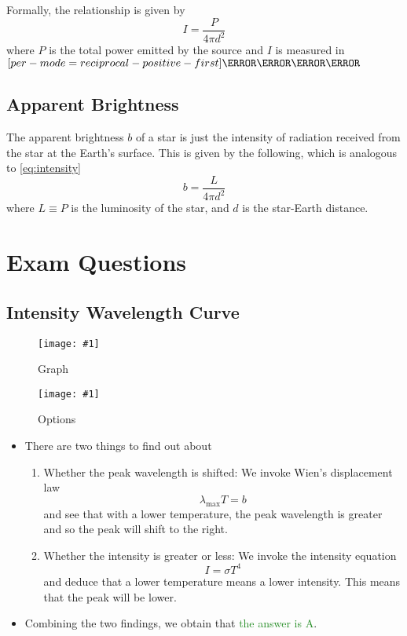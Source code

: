 \documentclass[a4paper,12pt]{article}
\let\oldsection\section
\renewcommand\section{\clearpage\oldsection}
\let\oldsi\si
\renewcommand{\si}[1]{\oldsi[per-mode=reciprocal-positive-first]{#1}}
\newcommand{\img}[4]{\begin{center}
  \begin{figure}[H]
    \centering
    \texttt{[image: \#1]}
    \caption{#3}
    \label{fig:#4}
  \end{figure}
\end{center}}
\begin{document}
Formally, the relationship is given by
\begin{equation}\label{eq:intensity}
  I = \frac{P}{4\pi d^2}
\end{equation}
where $P$ is the total power emitted by the source and $I$ is measured in $\si{\W\per\m\squared}$


\subsection{Apparent Brightness}

The apparent brightness $b$ of a star is just the intensity of radiation received from the star at the Earth's surface. This is given by the following, which is analogous to \cref{eq:intensity}
\begin{equation}\label{eq:brightness}
  b = \frac{L}{4\pi d^2}
\end{equation}
where $L \equiv P$ is the luminosity of the star, and $d$ is the star-Earth distance.

\pagebreak

\section{Exam Questions}

\subsection{Intensity Wavelength Curve}

\img{ex/1.png}{0.9}{Graph}{ex1}

\img{ex/2.png}{0.9}{Options}{ex2}

\begin{itemize}
  \item There are two things to find out about
        \begin{enumerate}
          \item Whether the peak wavelength is shifted: We invoke Wien's displacement law $$\lambda_{\max}T = b$$
                and see that with a lower temperature, the peak wavelength is greater and so the peak will shift to the right.

          \item Whether the intensity is greater or less: We invoke the intensity equation $$I = \sigma T^4$$ and deduce that a lower temperature means a lower intensity. This means that the peak will be lower.
        \end{enumerate}
  \item Combining the two findings, we obtain that \textcolor{ForestGreen}{the answer is A}.
\end{itemize}
\end{document}

